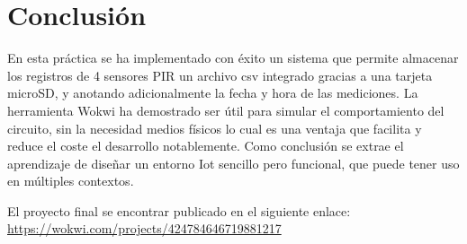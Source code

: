 \section{Conclusión}
En esta práctica se ha implementado con éxito un sistema que permite almacenar los registros de 4 sensores PIR un archivo csv integrado gracias a una tarjeta microSD, y anotando adicionalmente la fecha y hora de las mediciones. La herramienta Wokwi ha demostrado ser útil para simular el comportamiento del circuito, sin la necesidad medios físicos lo cual es una ventaja que facilita y reduce el coste el desarrollo notablemente. Como conclusión se extrae el aprendizaje de diseñar un entorno Iot sencillo pero funcional, que puede tener uso en múltiples contextos.

El proyecto final se encontrar publicado en el siguiente enlace:\\
\url{https://wokwi.com/projects/424784646719881217}
